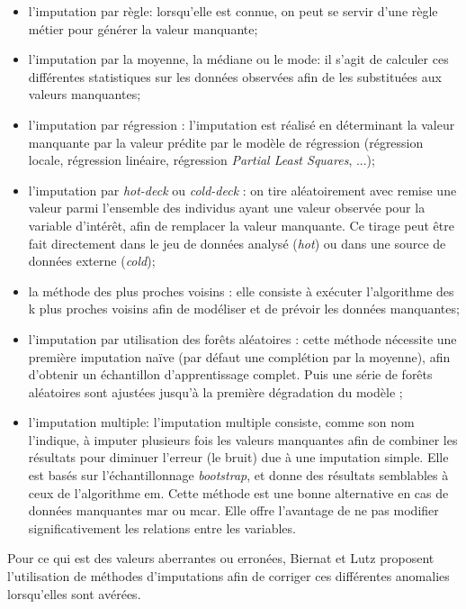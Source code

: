\begin{itemize}[parsep=0cm,itemsep=0cm]
\item l'imputation par r\`egle: lorsqu'elle est connue, on peut se servir d'une r\`egle m\'etier pour g\'en\'erer la valeur manquante;

\item l'imputation par la moyenne, la m\'ediane ou le mode: il s'agit de calculer ces diff\'erentes statistiques sur les donn\'ees observ\'ees afin de les substitu\'ees aux valeurs manquantes;

\item l'imputation par r\'egression : l'imputation est r\'ealis\'e en d\'eterminant la valeur manquante par la valeur pr\'edite par le mod\`ele de r\'egression (r\'egression locale, r\'egression lin\'eaire, r\'egression \textit{Partial Least Squares}, ...);

\item l'imputation par \textit{hot-deck} ou \textit{cold-deck} : on tire al\'eatoirement avec remise une valeur parmi l’ensemble des individus ayant une valeur observée pour la variable d’intérêt, afin de remplacer la valeur manquante. Ce tirage peut \^etre fait directement dans le jeu de donn\'ees analys\'e (\textit{hot}) ou dans une source de donn\'ees externe (\textit{cold});

\item la m\'ethode des plus proches voisins : elle consiste à exécuter l’algorithme des k plus proches voisins afin de modéliser et de prévoir les données manquantes;

\item l'imputation par utilisation des forêts aléatoires : cette méthode nécessite une première imputation naïve (par défaut une complétion par la moyenne), afin d’obtenir un échantillon d’apprentissage complet. Puis une série de forêts aléatoires sont ajustées jusqu’à la première dégradation du modèle \cite{wikistat-dm};

\item l'imputation multiple: l’imputation multiple consiste, comme son nom l’indique, à imputer plusieurs fois les valeurs manquantes afin de combiner les résultats pour diminuer
l’erreur (le bruit) due à une imputation simple. Elle est basés sur l'échantillonnage \textit{bootstrap}, et donne des r\'esultats semblables \`a ceux de l'algorithme \acrfull{em}. Cette m\'ethode est une bonne alternative en cas de donn\'ees manquantes \acrshort{mar} ou \acrshort{mcar}. Elle offre l'avantage de ne pas modifier significativement les relations entre les variables.
\end{itemize}
Pour ce qui est des valeurs aberrantes ou erron\'ees, Biernat et Lutz \cite{datascience} proposent l'utilisation de m\'ethodes d'imputations afin de corriger ces diff\'erentes anomalies lorsqu'elles sont av\'er\'ees. \\

